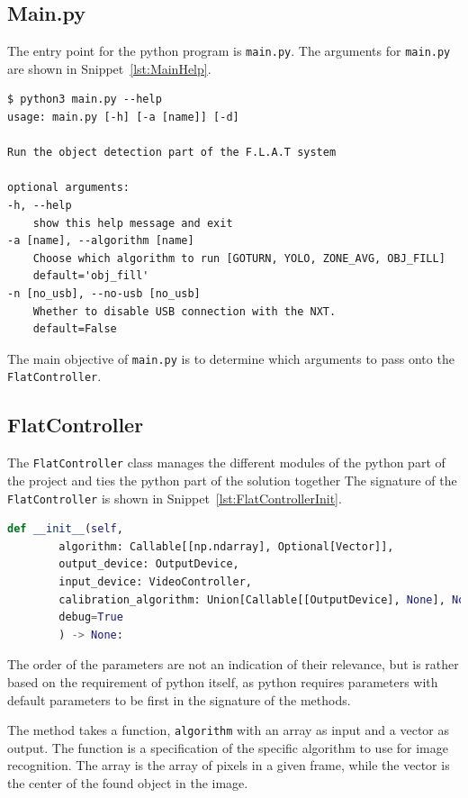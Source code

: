 \subsection{Main.py}
The entry point for the python program is \texttt{main.py}.
The arguments for \texttt{main.py}  are shown in Snippet~\ref{lst:MainHelp}.
\begin{lstlisting}[label={lst:MainHelp},caption={The help message of the commandline interface}]
$ python3 main.py --help
usage: main.py [-h] [-a [name]] [-d]

Run the object detection part of the F.L.A.T system

optional arguments:
-h, --help            
	show this help message and exit
-a [name], --algorithm [name] 
	Choose which algorithm to run [GOTURN, YOLO, ZONE_AVG, OBJ_FILL]
	default='obj_fill'
-n [no_usb], --no-usb [no_usb]
	Whether to disable USB connection with the NXT.
	default=False
\end{lstlisting}

The main objective of \texttt{main.py} is to determine which arguments to pass onto the \texttt{FlatController}.

\subsection{FlatController}\label{flatcontrollerimplementation}
The \texttt{FlatController} class manages the different modules of the python part of the project and ties the python part of the solution together
The signature of the \texttt{FlatController} is shown in Snippet~\ref{lst:FlatControllerInit}.

\begin{lstlisting}[language=Python,label={lst:FlatControllerInit},caption={Initialization method of the \texttt{FlatController} class}]
	def __init__(self,
		algorithm: Callable[[np.ndarray], Optional[Vector]],
		output_device: OutputDevice,
		input_device: VideoController,
		calibration_algorithm: Union[Callable[[OutputDevice], None], None] = None,
		debug=True
		) -> None:
\end{lstlisting}

The order of the parameters are not an indication of their relevance, but is rather based on the requirement of python itself, as python requires parameters with default parameters to be first in the signature of the methods.

The method takes a function, \texttt{algorithm} with an array as input and a vector as output.
The function is a specification of the specific algorithm to use for image recognition.
The array is the array of pixels in a given frame, while the vector is the center of the found object in the image.

